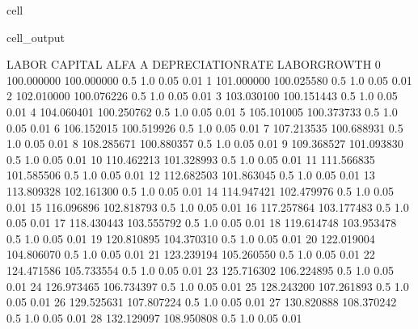 \documentclass[letterpaper,10pt,english]{jupyterBook}
\begin{document}
\begin{sphinxuseclass}{cell}
\begin{sphinxVerbatimOutput}
\begin{sphinxuseclass}{cell_output}
\begin{sphinxVerbatim}[commandchars=\\\{\}]
         LABOR     CAPITAL  ALFA    A  DEPRECIATION\PYGZus{}RATE  LABOR\PYGZus{}GROWTH  \PYGZbs{}
0   100.000000  100.000000   0.5  1.0               0.05          0.01   
1   101.000000  100.025580   0.5  1.0               0.05          0.01   
2   102.010000  100.076226   0.5  1.0               0.05          0.01   
3   103.030100  100.151443   0.5  1.0               0.05          0.01   
4   104.060401  100.250762   0.5  1.0               0.05          0.01   
5   105.101005  100.373733   0.5  1.0               0.05          0.01   
6   106.152015  100.519926   0.5  1.0               0.05          0.01   
7   107.213535  100.688931   0.5  1.0               0.05          0.01   
8   108.285671  100.880357   0.5  1.0               0.05          0.01   
9   109.368527  101.093830   0.5  1.0               0.05          0.01   
10  110.462213  101.328993   0.5  1.0               0.05          0.01   
11  111.566835  101.585506   0.5  1.0               0.05          0.01   
12  112.682503  101.863045   0.5  1.0               0.05          0.01   
13  113.809328  102.161300   0.5  1.0               0.05          0.01   
14  114.947421  102.479976   0.5  1.0               0.05          0.01   
15  116.096896  102.818793   0.5  1.0               0.05          0.01   
16  117.257864  103.177483   0.5  1.0               0.05          0.01   
17  118.430443  103.555792   0.5  1.0               0.05          0.01   
18  119.614748  103.953478   0.5  1.0               0.05          0.01   
19  120.810895  104.370310   0.5  1.0               0.05          0.01   
20  122.019004  104.806070   0.5  1.0               0.05          0.01   
21  123.239194  105.260550   0.5  1.0               0.05          0.01   
22  124.471586  105.733554   0.5  1.0               0.05          0.01   
23  125.716302  106.224895   0.5  1.0               0.05          0.01   
24  126.973465  106.734397   0.5  1.0               0.05          0.01   
25  128.243200  107.261893   0.5  1.0               0.05          0.01   
26  129.525631  107.807224   0.5  1.0               0.05          0.01   
27  130.820888  108.370242   0.5  1.0               0.05          0.01   
28  132.129097  108.950808   0.5  1.0               0.05          0.01   


\end{sphinxVerbatim}
\end{sphinxuseclass}
\end{sphinxVerbatimOutput}
\end{sphinxuseclass}
\end{document}
